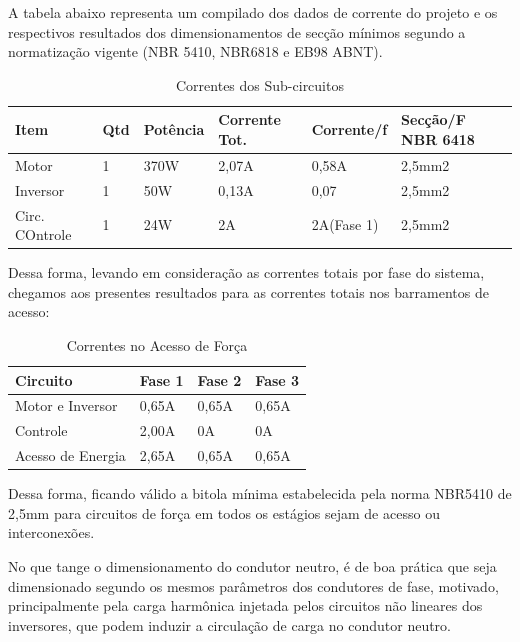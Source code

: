     A tabela abaixo representa um compilado dos dados de corrente do projeto e os respectivos resultados dos dimensionamentos de secção mínimos segundo a normatização vigente (NBR 5410, NBR6818 e EB98 ABNT).

    \begin{table}[h]
  \centering
  \label{tab01}

  \begin{tabular}{llllll}
    \toprule
    \textbf{Item} & \textbf{Qtd} &
        \textbf{Potência} & \textbf{Corrente Tot.}  & \textbf{Corrente/f}  &
        \textbf{Secção/F NBR 6418} \\
    \midrule
    Motor & 1 & 370W & 2,07A & 0,58A & 2,5mm2 \\
    Inversor & 1 & 50W & 0,13A & 0,07 & 2,5mm2 \\
    Circ. COntrole & 1 & 24W & 2A & 2A(Fase 1) & 2,5mm2 \\
    \bottomrule
  \end{tabular}

  \caption{Correntes dos Sub-circuitos}
\end{table}

Dessa forma, levando em consideração as correntes totais por fase do sistema, chegamos aos presentes resultados para as correntes totais nos barramentos de acesso:

    \begin{table}[h]
  \centering
  \label{tab01}

  \begin{tabular}{llll}
    \toprule
    \textbf{Circuito} & \textbf{Fase 1} & \textbf{Fase 2} & \textbf{Fase 3}\\
    \midrule
    Motor e Inversor & 0,65A & 0,65A & 0,65A \\
    Controle & 2,00A & 0A & 0A \\
        Acesso de Energia & 2,65A & 0,65A & 0,65A \\
    \bottomrule
  \end{tabular}

  \caption{Correntes no Acesso de Força}
\end{table}

Dessa forma, ficando válido a bitola mínima estabelecida pela norma NBR5410 de 2,5mm para circuitos de força em todos os estágios sejam de acesso ou interconexões. \cite{NBR5410}

No que tange o dimensionamento do condutor neutro, é de boa prática que seja dimensionado segundo os mesmos parâmetros dos condutores de fase, motivado, principalmente pela carga harmônica injetada pelos circuitos não lineares dos inversores, que podem induzir a circulação de carga no condutor neutro.

